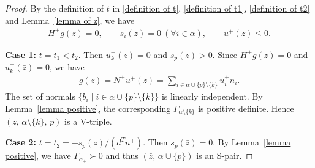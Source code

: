 \documentclass{article}
\begin{document}
	\begin{proof}
		By the definition of $t$ in \eqref{definition of t}, \eqref{definition of t1}, \eqref{definition of t2} and Lemma~\ref{lemma of z}, we have
		\begin{align*}
		H^{+} g(\bar{z}) = 0, \qquad
		s_{i}(\bar{z}) = 0~(\forall i \in \alpha), \qquad
		u^{+}(\bar{z}) \le 0.
		\end{align*}

		\noindent\textbf{Case 1:} $t = t_{1} < t_{2}$.  
		Then $u_{k}^{+}(\bar{z}) = 0$ and $s_{p}(\bar{z}) > 0$. Since $H^{+}g(\bar{z}) = 0$ and $u_{k}^{+}(\bar{z}) = 0$, we have
		\begin{align*}
		g(\bar{z}) = N^{+}u^{+}(\bar{z}) = 
		\sum_{i \in \alpha \cup \{p\} \setminus \{k\}} u_{i}^{+} n_{i}.
		\end{align*}
		The set of normals $\{ b_{i} \mid i \in \alpha \cup \{p\} \setminus \{k\} \}$ is linearly independent.  
		By Lemma~\ref{lemma positive}, the corresponding $\Gamma_{\alpha\setminus\{k\}}$ is positive definite. Hence $(\bar{z},\, \alpha \setminus \{k\},\, p)$ is a V-triple.
		
		\noindent\textbf{Case 2:} $t = t_{2} = -s_{p}(z)/(d^{T}n^{+})$.  
		Then $s_{p}(\bar{z}) = 0$.  
		By Lemma~\ref{lemma positive}, we have $\Gamma_{\alpha_{+}} \succ 0$ and thus $(\bar{z},\, \alpha \cup \{p\})$ is an S-pair.


\end{proof}
\end{document}
